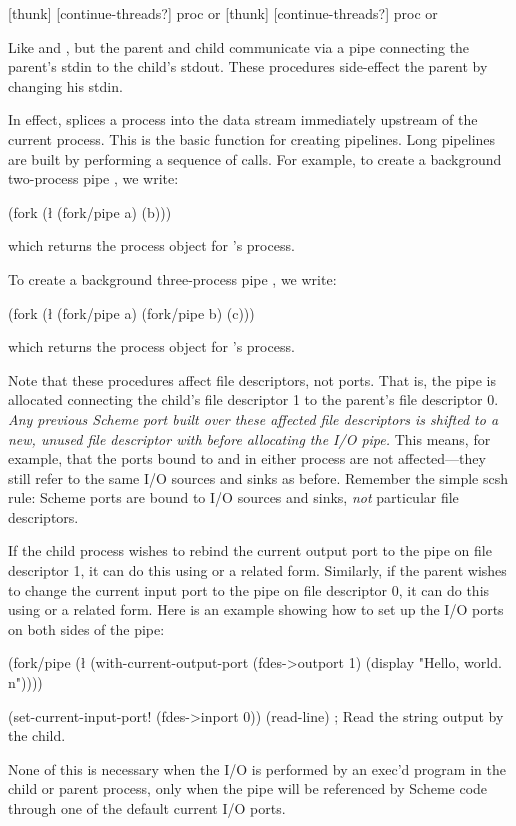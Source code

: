   {[thunk] [continue-threads?]} {proc or \sharpf}
 {[thunk] [continue-threads?]} {proc or \sharpf}
\begin{desc}
    Like  and , but the parent and child communicate via a
    pipe connecting the parent's stdin to the child's stdout. These procedures
    side-effect the parent by changing his stdin.

    In effect,  splices a process into the data stream
    immediately upstream of the current process.
    This is the basic function for creating pipelines.
    Long pipelines are built by performing a sequence of  calls.
    For example, to create a background two-process pipe , we write:
%
\begin{code}
(fork (\l{} (fork/pipe a) (b)))\end{code}
%
    which returns the process object for 's process.

    To create a background three-process pipe , we write:
%
\begin{code}
(fork (\l{} (fork/pipe a)
            (fork/pipe b)
            (c)))\end{code}
%    
    which returns the process object for 's process.

    Note that these procedures affect file descriptors, not ports.
    That is, the pipe is allocated connecting the child's file descriptor
    1 to the parent's file descriptor 0.
    \emph{Any previous Scheme port built over these affected file descriptors
    is shifted to a new, unused file descriptor with  before
    allocating the I/O pipe.}
    This means, for example, that the ports bound to 
    and  in either process are not affected---they 
    still refer to the same I/O sources and sinks as before.
    Remember the simple scsh rule: Scheme ports are bound to I/O sources
    and sinks, \emph{not} particular file descriptors.

    If the child process wishes to rebind the current output port
    to the pipe on file descriptor 1, it can do this using 
     or a related form.
    Similarly, if the parent wishes to change the current input port
    to the pipe on file descriptor 0, it can do this using
     or a related form.
    Here is an example showing how to set up the I/O ports on both sides
    of the pipe:
\begin{code}
(fork/pipe (\l{}
             (with-current-output-port (fdes->outport 1)
               (display "Hello, world.\\n"))))

(set-current-input-port! (fdes->inport 0))
(read-line)     ; Read the string output by the child.\end{code}
None of this is necessary when the I/O is performed by an exec'd
program in the child or parent process, only when the pipe will
be referenced by Scheme code through one of the default current I/O
ports.
\end{desc}

